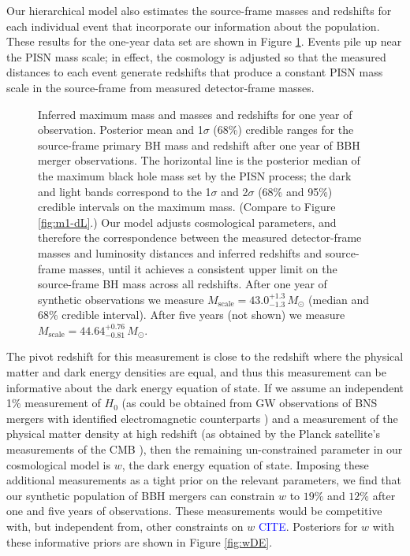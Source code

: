 \documentclass[modern]{aastex62}
\newcommand{\citationhere}{\textcolor{blue}{CITE}}
\newcommand{\MScale}{M_{\mathrm{scale}}}
\newcommand{\MScaleOneYear}{43.0^{+1.3}_{-1.3} \, \MSun{}}
\newcommand{\MScaleFiveYear}{44.64^{+0.76}_{-0.81} \, \MSun{}}
\newcommand{\SigmawDEOneYear}{19 \%}
\newcommand{\SigmawDEFiveYear}{12 \%}
\newcommand{\MSun}{M_\odot}
\begin{document}
Our hierarchical model also estimates the source-frame masses and redshifts for
each individual event that incorporate our information about the population.
These results for the one-year data set are shown in Figure
\ref{fig:mass-correction}.  Events pile up near the \ac{PISN} mass scale; in
effect, the cosmology is adjusted so that the measured distances to each event
generate redshifts that produce a constant \ac{PISN} mass scale in the
source-frame from measured detector-frame masses.

\begin{figure}
%
  \caption{\label{fig:mass-correction} Inferred maximum mass and masses and
  redshifts for one year of observation.  Posterior mean and 1$\sigma$ (68\%)
  credible ranges for the source-frame primary \ac{BH} mass and redshift after
  one year of \ac{BBH} merger observations.  The horizontal line is the
  posterior median of the maximum black hole mass set by the PISN process; the
  dark and light bands correspond to the 1$\sigma$ and 2$\sigma$ (68\% and 95\%)
  credible intervals on the maximum mass.  (Compare to Figure \ref{fig:m1-dL}.)
  Our model adjusts cosmological parameters, and therefore the correspondence
  between the measured detector-frame masses and luminosity distances and
  inferred redshifts and source-frame masses, until it achieves a consistent
  upper limit on the source-frame \ac{BH} mass across all redshifts.  After one
  year of synthetic observations we measure $\MScale{} = \MScaleOneYear{}$ (median
  and 68\% credible interval).  After five years (not shown) we measure $\MScale{}
  = \MScaleFiveYear{}$.}
%
\end{figure}

The pivot redshift for this measurement is close to the redshift where the
physical matter and dark energy densities are equal, and thus this measurement
can be informative about the dark energy equation of state.  If we assume an
independent 1\% measurement of $H_0$ (as could be obtained from \ac{GW}
observations of \ac{BNS} mergers with identified electromagnetic counterparts
\citep{Chen2017}) and a measurement of the physical matter density at high
redshift (as obtained by the Planck satellite's measurements of the \ac{CMB}
\citep{Planck2016}), then the remaining un-constrained parameter in our
cosmological model is $w$, the dark energy equation of state.  Imposing these
additional measurements as a tight prior on the relevant parameters, we find
that our synthetic population of \ac{BBH} mergers can constrain $w$ to
$\SigmawDEOneYear{}$ and $\SigmawDEFiveYear{}$ after one and five years of
observations.  These measurements would be competitive with, but independent
from, other constraints on $w$ \citationhere{}.  Posteriors for $w$ with these
informative priors are shown in Figure \ref{fig:wDE}.
\end{document}
